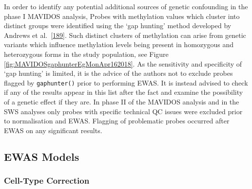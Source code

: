 \documentclass[
]{book}
\begin{document}
In order to identify any potential additional sources of genetic confounding in the phase I MAVIDOS analysis, Probes with methylation values which cluster into distinct groups were identified using the `gap hunting' method developed by Andrews et al.~{[}\protect\hyperlink{ref-Andrews2016}{189}{]}.
Such distinct clusters of methylation can arise from genetic variants which influence methylation levels being present in homozygous and heterozygous forms in the study population, see Figure \ref{fig:MAVIDOSgaphunterEgMonApr162018}.
As the sensitivity and specificity of `gap hunting' is limited, it is the advice of the authors not to exclude probes flagged by \texttt{gaphunter()} prior to performing EWAS.
It is instead advised to check if any of the results appear in this list after the fact and examine the possibility of a genetic effect if they are.
In phase II of the MAVIDOS analysis and in the SWS analyses only probes with specific technical QC issues were excluded prior to normalisation and EWAS.
Flagging of problematic probes occurred after EWAS on any significant results.

\hypertarget{ewas-models}{%
\subsection{EWAS Models}\label{ewas-models}}

\hypertarget{cell-type-correction}{%
\subsubsection{Cell-Type Correction}\label{cell-type-correction}}
\end{document}
